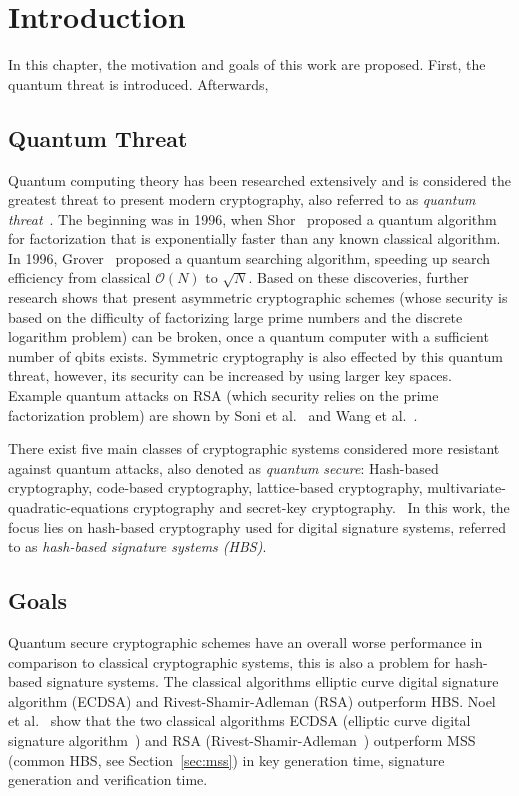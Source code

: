 \chapter{Introduction}
\label{cha:introduction}
In this chapter, the motivation and goals of this work are proposed. First, the quantum threat is introduced. Afterwards, 

\section{Quantum Threat}
Quantum computing theory has been researched extensively and is considered the greatest threat to present modern cryptography, also referred to as \textit{quantum threat}~\cite{impact_quantum_crypto_2018}.
The beginning was in 1996, when Shor~\cite{shors_algo_original_1999} proposed a quantum algorithm for factorization that is exponentially faster than any known classical algorithm. In 1996, Grover~\cite{grovers_algo_basispaper_1997} proposed a quantum searching algorithm, speeding up search efficiency from classical $\mathcal{O}(N)$ to $\sqrt{N}$. 
Based on these discoveries, further research shows that present asymmetric cryptographic schemes (whose security is based on the difficulty of factorizing large prime numbers and the discrete logarithm problem) can be broken, once a quantum computer with a sufficient number of qbits exists. 
Symmetric cryptography is also effected by this quantum threat, however, its security can be increased by using larger key spaces.~\cite{impact_quantum_crypto_2018} %
Example quantum attacks on RSA (which security relies on the prime factorization problem) are shown by Soni et al.~\cite{RSA_pq-attack_examples_2018} and Wang et al.~\cite{RSA_pq-attack_without_factorization_2018}. %

There exist five main classes of cryptographic systems considered more resistant against quantum attacks, also denoted as \textit{quantum secure}: Hash-based cryptography, code-based cryptography, lattice-based cryptography, multivariate-quadratic-equations cryptography and secret-key cryptography.~\cite{book_pqc_bernstein_2004}
In this work, the focus lies on hash-based cryptography used for digital signature systems, referred to as \textit{hash-based signature systems (HBS)}.

\section{Goals} 
Quantum secure cryptographic schemes have an overall worse performance in comparison to classical cryptographic systems, %
this is also a problem for hash-based signature systems. The classical algorithms elliptic curve digital signature algorithm (ECDSA) and Rivest-Shamir-Adleman (RSA) outperform HBS. Noel et al.~\cite{comparison_performance_RSA_ECDSA_Merkle_WOTS_2021} show that the two classical algorithms ECDSA (elliptic curve digital signature algorithm~\cite{}) and RSA (Rivest-Shamir-Adleman~\cite{}) outperform MSS (common HBS, see Section~\ref{sec:mss}) in key generation time, signature generation and verification time.

